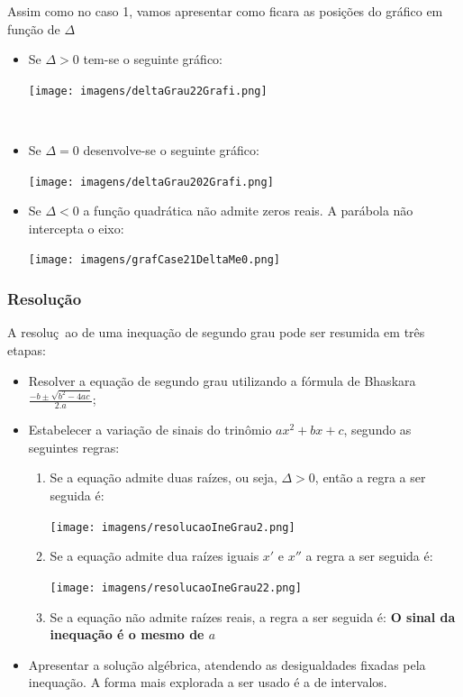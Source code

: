 \documentclass[a4paper,12pt,twoside,BCOR=10mm]{scrbook}
\begin{document}
\begin{titlepage}
Assim como no caso 1, vamos apresentar como ficara as posições do gráfico em função de $\Delta$
\begin{itemize}
\item Se $\Delta > 0$ tem-se o seguinte gráfico:\\
	\begin{center}
	\texttt{[image: imagens/deltaGrau22Grafi.png]}
	\end{center}
	\\
\item Se  $\Delta = 0$ desenvolve-se o seguinte gráfico:\\
	\begin{center}
	\texttt{[image: imagens/deltaGrau202Grafi.png]}
	\end{center}
\item Se $\Delta < 0$ a função quadrática não admite zeros reais. A parábola não intercepta o eixo:\\
	\begin{center}
	\texttt{[image: imagens/grafCase21DeltaMe0.png]}
	\end{center}
\end{itemize}

\subsubsection{Resolução}
A resoluç~ao de uma inequação de segundo grau pode ser resumida em três etapas:
\begin{itemize}
\item Resolver a equação de segundo grau utilizando a fórmula de Bhaskara $\frac{-b \pm \sqrt{b^{2} - 4ac}}{2.a}$;
\item Estabelecer a variação de sinais do trinômio $ax^{2} + bx + c$, segundo as seguintes regras:
	\begin{enumerate}
		\item Se a equação admite duas raízes, ou seja, $\Delta > 0$, então a regra a ser seguida é:	
		\begin{flushleft}
		\texttt{[image: imagens/resolucaoIneGrau2.png]}
		\end{flushleft}
		
		\item Se a equação admite dua raízes iguais $x'$ e $x''$ a regra a ser seguida é:
		\begin{flushleft}
		\texttt{[image: imagens/resolucaoIneGrau22.png]}
		\end{flushleft}
		
		\item Se a equação não admite raízes reais, a regra a ser seguida é: \textbf{O sinal da inequação é o mesmo de $a$}
	\end{enumerate}
\item Apresentar a solução algébrica, atendendo as desigualdades fixadas pela inequação. A forma mais explorada a ser usado é a de intervalos.
	

\end{itemize}
\end{titlepage}
\end{document}

